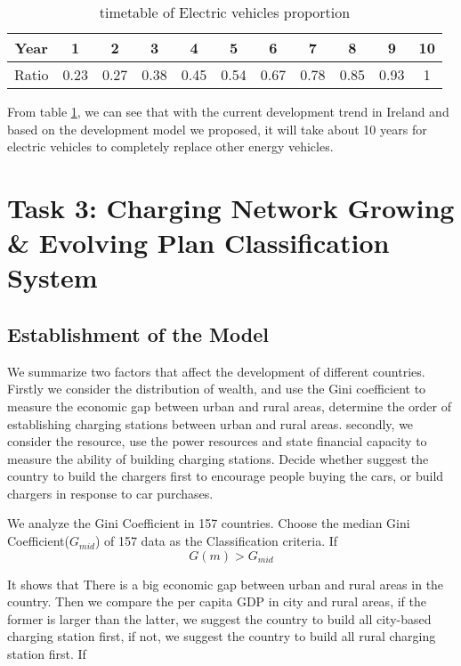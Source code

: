 \documentclass{mcmthesis}
\begin{document}
\begin{table}[h]
\centering
\caption{timetable of Electric vehicles proportion}\label{tab:timetable of Electric vehicles proportion}
\begin{tabular}{ccccccccccc}
\toprule
 Year & 1 &2 &3 &4 &5 &6 &7 &8 &9 &10 \\
\midrule
Ratio & 0.23 & 0.27 &	0.38 &	0.45 & 0.54 & 0.67 & 	0.78 & 	0.85 & 	0.93 &	1 \\	
\bottomrule
\end{tabular}
\end{table}


\par From table \ref{tab:timetable of Electric vehicles proportion}, we can see that with the current development trend in Ireland and based on the development model we proposed, it will take about 10 years for electric vehicles to completely replace other energy vehicles.


\section{Task 3: Charging Network Growing \& Evolving Plan Classification System}
\subsection{Establishment of the Model}

\par We summarize two factors that affect the development of different countries. Firstly we consider the distribution of wealth, and use the Gini coefficient to measure the economic gap between urban and rural areas, determine the order of establishing charging stations between urban and rural areas. secondly, we consider the resource, use the power resources and state financial capacity to measure the ability of building charging stations. Decide whether suggest the country to build the chargers first to encourage people buying the cars, or build chargers in response to car purchases.

\par We analyze the Gini Coefficient in 157 countries. Choose the median Gini Coefficient($G_{mid}$) of 157 data as the Classification criteria.
If 
$$G(m)>G_{mid} $$

\par It shows that There is a big economic gap between urban and rural areas in the country. Then we compare the per capita GDP in city and rural areas, if the former is larger than the latter, we suggest the country to build all city-based charging station first, if not, we suggest the country to build all rural charging station first.
If
\end{document}
